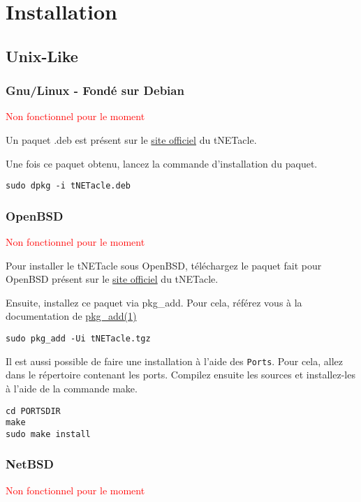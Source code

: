 \section{Installation}
\subsection{Unix-Like}
\subsubsection{Gnu/Linux - Fondé sur Debian}
\textcolor{red}{Non fonctionnel pour le moment}

Un paquet .deb est présent sur le \href{http://eip.epitech.eu/2013/tnetacle/tnetacle.html}{site officiel} du tNETacle.

Une fois ce paquet obtenu, lancez la commande d'installation du paquet.

\begin{lstlisting}
sudo dpkg -i tNETacle.deb
\end{lstlisting}

\subsubsection{OpenBSD}
\textcolor{red}{Non fonctionnel pour le moment}

Pour installer le tNETacle sous OpenBSD, téléchargez le
paquet fait pour OpenBSD présent sur le \href{http://eip.epitech.eu/2013/tnetacle/tnetacle.html}{site officiel} du tNETacle.

Ensuite, installez ce paquet via pkg_add. Pour cela, référez vous à la documentation de
\href{http://www.openbsd.org/faq/fr/faq15.html}{pkg\_add(1)}

\begin{lstlisting}
sudo pkg_add -Ui tNETacle.tgz
\end{lstlisting}


Il est aussi possible de faire une installation à l'aide des \texttt{Ports}.
Pour cela, allez dans le répertoire contenant les ports.
Compilez ensuite les sources et installez-les à l'aide de la commande make.

\begin{lstlisting}
cd PORTSDIR
make
sudo make install
\end{lstlisting}

\subsubsection{NetBSD}
\textcolor{red}{Non fonctionnel pour le moment}

